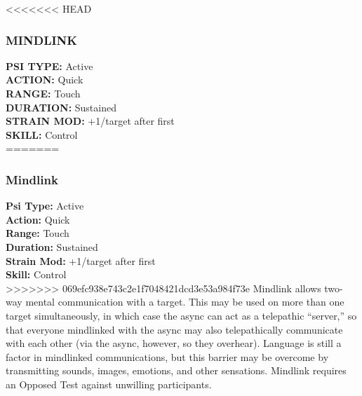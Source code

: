 <<<<<<< HEAD \subsubsection{MINDLINK} \textbf{PSI TYPE:} Active \\ \textbf{ACTION:} Quick \\ \textbf{RANGE:} Touch \\ \textbf{DURATION:} Sustained \\ \textbf{STRAIN MOD:} +1/target after first \\ \textbf{SKILL:} Control\\ ======= \subsubsection{Mindlink} \textbf{Psi Type:} Active \\ \textbf{Action:} Quick \\ \textbf{Range:} Touch \\ \textbf{Duration:} Sustained \\ \textbf{Strain Mod:} +1/target after first \\ \textbf{Skill:} Control\\ >>>>>>> 069efc938e743c2e1f7048421dcd3e53a984f73e Mindlink allows two-way mental communication with a target. This may be used on more than one target simultaneously, in which case the async can act as a telepathic “server,” so that everyone mindlinked with the async may also telepathically communicate with each other (via the async, however, so they overhear). Language is still a factor in mindlinked communications, but this barrier may be overcome by transmitting sounds, images, emotions, and other sensations. Mindlink requires an Opposed Test against unwilling participants. 

